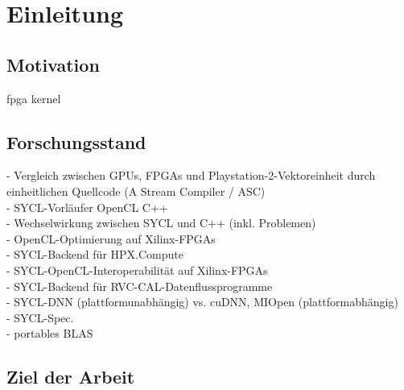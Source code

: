 \chapter{Einleitung}\label{einleitung}

\section{Motivation}\label{einleitung:motivation}

\gls{fpga}
\gls{kernel}

\section{Forschungsstand}\label{einleitung:forschung}

\cite{howes2006} - Vergleich zwischen GPUs, FPGAs und Playstation-2-Vektoreinheit durch einheitlichen Quellcode (A Stream Compiler / ASC) \\
\cite{gaster2013} - SYCL-Vorläufer OpenCL C++ \\
\cite{wong2016} - Wechselwirkung zwischen SYCL und C++ (inkl. Problemen) \\
\cite{fifield2016} - OpenCL-Optimierung auf Xilinx-FPGAs \\
\cite{copik2017} - SYCL-Backend für HPX.Compute\\
\cite{doumoulakis2017} - SYCL-OpenCL-Interoperabilität auf Xilinx-FPGAs \\
\cite{krebs2019} - SYCL-Backend für RVC-CAL-Datenflussprogramme \\
\cite{burns2019} - SYCL-DNN (plattformunabhängig) vs. cuDNN, MIOpen (plattformabhängig) \\
\cite{sycl2019} - SYCL-Spec.\\
\cite{rodriguez-gutiez2019} - portables BLAS

\section{Ziel der Arbeit}\label{einleitung:ziel}
